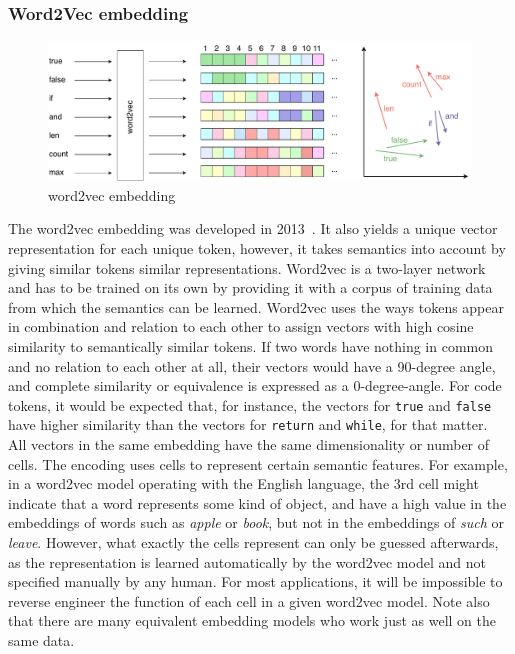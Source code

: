 \documentclass[
a4paper,
pagesize,
pdftex,
12pt,
ngerman,
fleqn,
final,
]{scrartcl}
\begin{document}
	\subsubsection{Word2Vec embedding}\label{word2vec}
	\begin{figure}[ht]
		\centering
		\includegraphics[width=\linewidth]{img/word2vecEmbedding}
		\caption{word2vec embedding}
		\label{fig:word2vecEmbedding}
	\end{figure}
	The word2vec embedding was developed in 2013~\cite{Mikolov.2013}. It also yields a unique vector representation for each unique token, however, it takes semantics into account by giving similar tokens similar representations. Word2vec is a two-layer network and has to be trained on its own by providing it with a corpus of training data from which the semantics can be learned. Word2vec uses the ways tokens appear in combination and relation to each other to assign vectors with high cosine similarity to semantically similar tokens. If two words have nothing in common and no relation to each other at all, their vectors would have a 90-degree angle, and complete similarity or equivalence is expressed as a 0-degree-angle. For code tokens, it would be expected that, for instance, the vectors for \texttt{true} and \texttt{false} have higher similarity than the vectors for \texttt{return} and \texttt{while}, for that matter.\\
	All vectors in the same embedding have the same dimensionality or number of cells. The encoding uses cells to represent certain semantic features. For example, in a word2vec model operating with the English language, the 3rd cell might indicate that a word represents some kind of object, and have a high value in the embeddings of words such as \textit{apple} or \textit{book}, but not in the embeddings of \textit{such} or \textit{leave}. However, what exactly the cells represent can only be guessed afterwards, as the representation is learned automatically by the word2vec model and not specified manually by any human. For most applications, it will be impossible to reverse engineer the function of each cell in a given word2vec model. Note also that there are many equivalent embedding models who work just as well on the same data.\\ 
\end{document}
